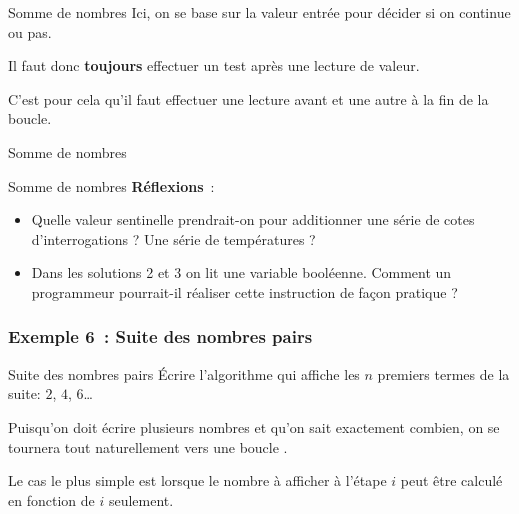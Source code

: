 \begin{frame}{Somme de nombres}
	Ici, on se base sur la valeur entrée pour décider si on continue ou pas. 
	
	\bigskip
	
	Il faut donc \textbf{toujours} effectuer un test
	après une lecture de valeur. 
	
	\bigskip
	
	C'est pour cela
	qu'il faut effectuer une lecture avant et une autre à
	la fin de la boucle.

\end{frame}

\begin{frame}{Somme de nombres}
\end{frame}

\begin{frame}{Somme de nombres}
	\textbf{Réflexions}~: 
	\begin{itemize}
	\item
		Quelle valeur sentinelle prendrait-on 
		pour additionner une série de cotes d'interrogations ? 
		Une série de températures ?
	\item
		Dans les solutions 2 et 3 on lit une variable booléenne. 
		Comment un programmeur pourrait-il réaliser 
		cette instruction de façon pratique ?		
	\end{itemize}
\end{frame}

\subsubsection{Exemple 6~: Suite des nombres pairs}

\begin{frame}{Suite des nombres pairs}
	Écrire l'algorithme qui affiche les $n$ premiers termes
	de la suite: $2$, $4$, $6$\dots
	
	\bigskip
	
	Puisqu'on doit écrire plusieurs nombres et qu'on sait exactement combien,
	on se tournera tout naturellement vers une boucle .

	\bigskip
	
	Le cas le plus simple est lorsque le nombre à afficher à l'étape $i$
	peut être calculé en fonction de $i$ seulement.
	
\end{frame}


